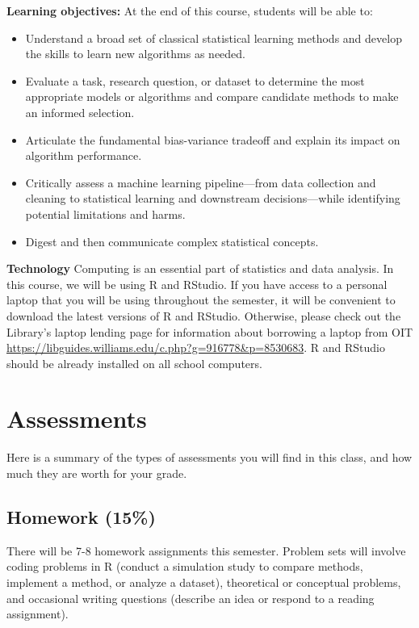 \documentclass[11pt]{article}
\begin{document}
\begin{list}{}{}
\item[\textbf{Learning objectives:}] At the end of this course, students will be able to: 
\begin{itemize}
\item Understand a broad set of classical statistical learning methods and develop the skills to learn new algorithms as needed.
\item Evaluate a task, research question, or dataset to determine the most appropriate models or algorithms and compare candidate methods to make an informed selection.
\item Articulate the fundamental bias-variance tradeoff and explain its impact on algorithm performance.
\item Critically assess a machine learning pipeline—from data collection and cleaning to statistical learning and downstream decisions—while identifying potential limitations and harms.
\item Digest and then communicate complex statistical concepts. 
\end{itemize}
\item[\textbf{Technology}] Computing is an essential part of statistics and data analysis. In this course, we will be using R and RStudio. If you have access to a personal laptop that you will be using throughout the semester, it will be convenient to download the latest versions of R and RStudio. Otherwise, please check out the Library's laptop lending page for information about borrowing a laptop from OIT \url{https://libguides.williams.edu/c.php?g=916778&p=8530683}. R and RStudio should be already installed on all school computers.
\end{list}

\section{Assessments}

Here is a summary of the types of assessments you will find in this class, and how much they are worth for your grade. 

\subsection{Homework (15\%)}

There will be 7-8 homework assignments this semester. Problem sets will involve coding problems in R (conduct a simulation study to compare methods, implement a method, or analyze a dataset), theoretical or conceptual problems, and occasional writing questions (describe an idea or respond to a reading assignment). 
\end{document}
